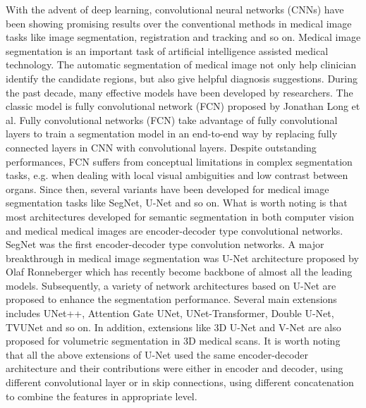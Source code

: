 \documentclass[UTF8]{article} %
\begin{document}
With the advent of deep learning, convolutional neural networks (CNNs) have been showing promising results over the conventional methods in medical image tasks like image segmentation, registration and tracking and so on. Medical image segmentation is an important task of artificial intelligence assisted medical technology. The automatic segmentation of medical image not only help clinician identify the candidate regions, but also give helpful diagnosis suggestions. During the past decade, many effective models have been developed by researchers. The classic model is fully convolutional network (FCN) proposed by Jonathan Long et al\cite{LongSD15}. Fully convolutional networks (FCN) take advantage of fully convolutional layers to train a segmentation model in an end-to-end way by replacing fully connected layers in CNN with convolutional layers. Despite outstanding performances, FCN suffers from conceptual limitations in complex segmentation tasks, e.g. when dealing with local visual ambiguities and low contrast between organs. Since then,  several variants have been developed for medical image segmentation tasks like SegNet, U-Net and so on. What is worth noting is that most architectures developed for semantic segmentation in both computer vision and medical medical images are encoder-decoder type convolutional networks. SegNet was the first encoder-decoder type convolution networks. A major breakthrough in medical image segmentation was U-Net architecture proposed by Olaf Ronneberger\cite{RonnebergerFB15} which has recently become backbone of almost all the leading models. Subsequently, a variety of network architectures based on U-Net are proposed to enhance the segmentation performance. Several main extensions includes UNet++, Attention Gate UNet, UNet-Transformer, Double U-Net, TVUNet and so on. In addition, extensions like 3D U-Net and V-Net are also proposed for volumetric segmentation in 3D medical scans. It is worth noting that all the above extensions of U-Net used the same encoder-decoder architecture and their contributions were either in encoder and decoder, using different convolutional layer or in skip connections, using different concatenation to combine the features in appropriate level. 
\end{document}
